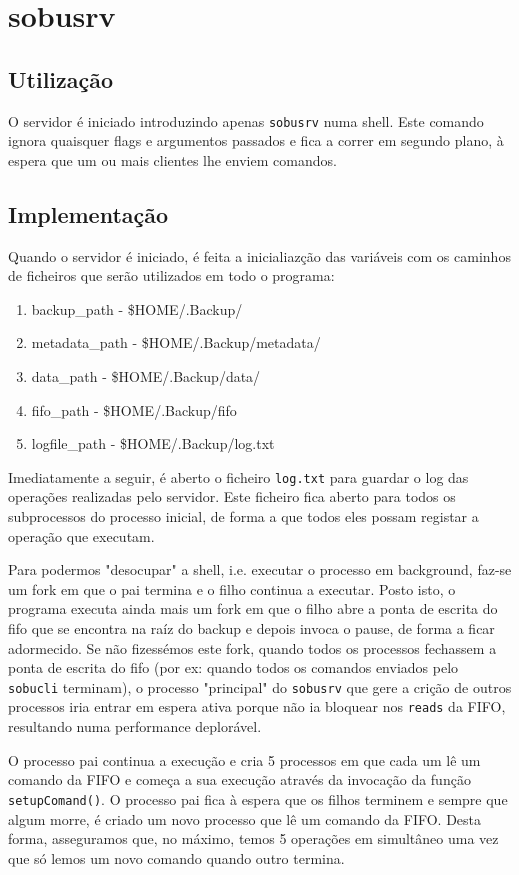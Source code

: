 \section{sobusrv}
\subsection{Utilização}
O servidor é iniciado introduzindo apenas \texttt{sobusrv} numa shell. Este comando ignora quaisquer flags e argumentos passados e fica a correr em segundo plano, à 
espera que um ou mais clientes lhe enviem comandos.
\subsection{Implementação}
Quando o servidor é iniciado, é feita a inicialiazção das variáveis com os caminhos de ficheiros que serão utilizados em todo o programa:
\begin{enumerate}
\item backup\_path - \$HOME/.Backup/
\item metadata\_path -  \$HOME/.Backup/metadata/
\item data\_path - \$HOME/.Backup/data/   
\item fifo\_path - \$HOME/.Backup/fifo
\item logfile\_path - \$HOME/.Backup/log.txt
\end{enumerate}
	
Imediatamente a seguir, é aberto o ficheiro \texttt{log.txt} para guardar o log das operações realizadas pelo servidor. Este ficheiro fica aberto para todos os 
subprocessos do processo inicial, de forma a que todos eles possam registar a operação que executam. 

Para podermos "desocupar" a shell, i.e. executar o processo em 
background, faz-se um fork em que o pai termina e o filho continua a executar. Posto isto, o programa executa ainda mais um fork em que o filho abre a ponta de escrita 
do fifo que se encontra na raíz do backup e depois invoca o pause, de forma a ficar adormecido.  
Se não fizessémos este fork, quando todos os processos fechassem a ponta de escrita do fifo (por ex: quando todos os comandos enviados pelo 
\texttt{sobucli} terminam), o processo "principal" do \texttt{sobusrv} que gere a crição de outros processos iria entrar em espera ativa porque não ia 
bloquear nos \texttt{reads} da FIFO, resultando numa performance deplorável. 

O processo pai continua a execução e cria 5 processos em que cada um lê um 
comando da FIFO e começa a sua execução através da invocação da função \texttt{setupComand()}. O processo pai fica à espera que os filhos terminem e sempre que algum
morre, é criado um novo processo que lê um comando da FIFO. Desta forma, asseguramos que, no máximo, temos 5 operações em simultâneo uma vez que só lemos um
novo comando quando outro termina. 

